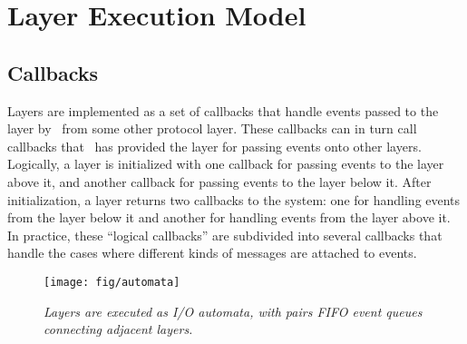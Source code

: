 \section{Layer Execution Model}

\subsection{Callbacks}
Layers are implemented as a set of callbacks that handle events passed to
the layer by \ensemble\ from some other protocol layer.  These callbacks can in
turn call callbacks that \ensemble\ has provided the layer for passing events
onto other layers.  Logically, a layer is initialized with one callback for
passing events to the layer above it, and another callback for passing
events to the layer below it.  After initialization, a layer returns two
callbacks to the system: one for handling events from the layer below it
and another for handling events from the layer above it.  In practice,
these ``logical callbacks'' are subdivided into several callbacks that
handle the cases where different kinds of messages are attached to events.

\begin{figure}[tb]
\begin{center}
\texttt{[image: fig/automata]}
\end{center}
\caption{\em Layers are executed as I/O automata, with pairs FIFO event
queues connecting adjacent layers.}
\label{fig:automata}
\end{figure}


